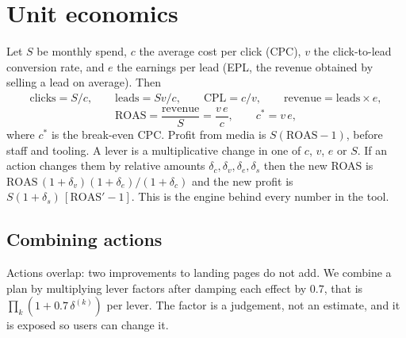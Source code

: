 \documentclass[10pt,a4paper]{article}
\begin{document}
\section{Unit economics}
Let $S$ be monthly spend, $c$ the average cost per click (CPC), $v$ the click-to-lead conversion rate, and $e$ the earnings per lead (EPL, the revenue obtained by selling a lead on average). Then
\begin{align}
 \text{clicks}=S/c,\qquad \text{leads}=Sv/c,\qquad \text{CPL}=c/v,\qquad \text{revenue}=\text{leads}\times e,
\end{align}
\begin{equation}
 \mathrm{ROAS}=\frac{\text{revenue}}{S}=\frac{v\,e}{c},\qquad c^{*}=v\,e,
\end{equation}
where $c^{*}$ is the break-even CPC. Profit from media is $S(\mathrm{ROAS}-1)$, before staff and tooling. A lever is a multiplicative change in one of $c$, $v$, $e$ or $S$. If an action changes them by relative amounts $\delta_c,\delta_v,\delta_e,\delta_s$ then the new ROAS is $\mathrm{ROAS}\,(1+\delta_v)(1+\delta_e)/(1+\delta_c)$ and the new profit is $S(1+\delta_s)\,[\mathrm{ROAS}'-1]$. This is the engine behind every number in the tool.

\subsection{Combining actions}
Actions overlap: two improvements to landing pages do not add. We combine a plan by multiplying lever factors after damping each effect by $0.7$, that is $\prod_k(1+0.7\,\delta^{(k)})$ per lever. The factor is a judgement, not an estimate, and it is exposed so users can change it.
\end{document}
